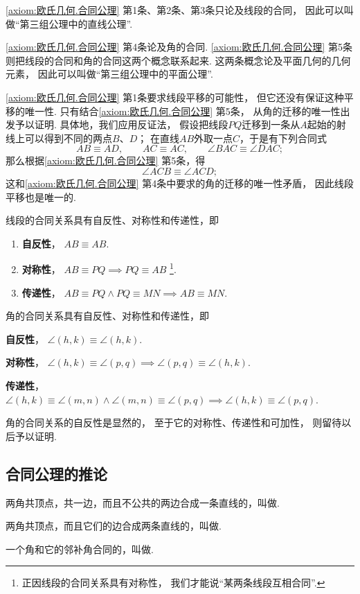 \cref{axiom:欧氏几何.合同公理} 第1条、第2条、第3条只论及线段的合同，
因此可以叫做“第三组公理中的直线公理”.

\cref{axiom:欧氏几何.合同公理} 第4条论及角的合同.
\cref{axiom:欧氏几何.合同公理} 第5条则把线段的合同和角的合同这两个概念联系起来.
这两条概念论及平面几何的几何元素，
因此可以叫做“第三组公理中的平面公理”.

\cref{axiom:欧氏几何.合同公理} 第1条要求线段平移的可能性，
但它还没有保证这种平移的唯一性.
只有结合\cref{axiom:欧氏几何.合同公理} 第5条，
从角的迁移的唯一性出发予以证明.
具体地，我们应用反证法，
假设把线段\(PQ\)迁移到一条从\(A\)起始的射线上可以得到不同的两点\(B\)、\(D\)；
在直线\(AB\)外取一点\(C\)，于是有下列合同式
\[
AB \equiv AD, \qquad
AC \equiv AC, \qquad
\angle BAC \equiv \angle DAC;
\]
那么根据\cref{axiom:欧氏几何.合同公理} 第5条，得
\[
\angle ACB \equiv \angle ACD;
\]
这和\cref{axiom:欧氏几何.合同公理} 第4条中要求的角的迁移的唯一性矛盾，
因此线段平移也是唯一的.

\begin{property}
线段的合同关系具有自反性、对称性和传递性，即
\begin{enumerate}
\item {\rm\bf 自反性}，
\(AB \equiv AB\).

\item {\rm\bf 对称性}，
\(AB \equiv PQ \implies PQ \equiv AB\)
\footnote{%
正因线段的合同关系具有对称性，
我们才能说“某两条线段互相合同”.
}.

\item {\rm\bf 传递性}，
\(AB \equiv PQ \land PQ \equiv MN \implies AB \equiv MN\).
\end{enumerate}
\end{property}

\begin{property}
角的合同关系具有自反性、对称性和传递性，即
\item {\rm\bf 自反性}，
\(\angle(h,k) \equiv \angle(h,k)\).

\item {\rm\bf 对称性}，
\(\angle(h,k) \equiv \angle(p,q)
\implies
\angle(p,q) \equiv \angle(h,k)\).

\item {\rm\bf 传递性}，
\(\angle(h,k) \equiv \angle(m,n)
\land
\angle(m,n) \equiv \angle(p,q)
\implies
\angle(h,k) \equiv \angle(p,q)\).
\end{property}
角的合同关系的自反性是显然的，
至于它的对称性、传递性和可加性，
则留待以后予以证明.

\subsection{合同公理的推论}
\begin{definition}
两角共顶点，共一边，而且不公共的两边合成一条直线的，叫做.
\end{definition}
\begin{definition}
两角共顶点，而且它们的边合成两条直线的，叫做.
\end{definition}
\begin{definition}
一个角和它的邻补角合同的，叫做.
\end{definition}

